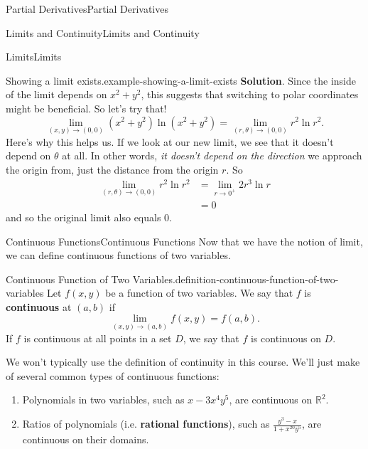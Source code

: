 \documentclass[10pt,]{book}
\newcommand{\terminology}[1]{\textbf{#1}}
\numberwithin{equation}{section}
\newcommand{\RR}{\mathbb{R}}
\begin{document}
\begin{chapterptx}{Partial Derivatives}{}{Partial Derivatives}{}{}
\begin{sectionptx}{Limits and Continuity}{}{Limits and Continuity}{}{}
\begin{subsectionptx}{Limits}{}{Limits}{}{}
\begin{example}{Showing a limit exists.}{example-showing-a-limit-exists}
\noindent\textbf{Solution}.\hypertarget{solution-173}{}\quad%
\hypertarget{p-1130}{}%
Since the inside of the limit depends on \(x^{2}+y^{2}\), this suggests that switching to polar coordinates might be beneficial. So let's try that!%
\begin{equation*}
\lim_{(x,y)\to(0,0)}(x^{2}+y^{2})\ln(x^{2}+y^{2}) = \lim_{(r,\theta)\to(0,0)}r^{2}\ln r^{2}.
\end{equation*}
Here's why this helps us. If we look at our new limit, we see that it doesn't depend on \(\theta\) at all. In other words, \emph{it doesn't depend on the direction} we approach the origin from, just the distance from the origin \(r\). So%
\begin{align*}
\lim_{(r,\theta)\to(0,0)}r^{2}\ln r^{2} & = \lim_{r\to0^{+}} 2r^{3}\ln r \\
& = 0 
\end{align*}
and so the original limit also equals \(0\).%
\end{example}
\end{subsectionptx}
%
%
\typeout{************************************************}
\typeout{************************************************}
%
\begin{subsectionptx}{Continuous Functions}{}{Continuous Functions}{}{}\label{subsection-continuous-functions}
\hypertarget{p-1131}{}%
Now that we have the notion of limit, we can define continuous functions of two variables.%
\begin{definition}{Continuous Function of Two Variables.}{definition-continuous-function-of-two-variables}%
\hypertarget{p-1132}{}%
Let \(f(x,y)\) be a function of two variables. We say that \(f\) is \terminology{continuous} at \((a,b)\) if%
\begin{equation*}
\lim_{(x,y)\to(a,b)}f(x,y) = f(a,b).
\end{equation*}
If \(f\) is continuous at all points in a set \(D\), we say that \(f\) is continuous on \(D\).%
\end{definition}
\hypertarget{p-1133}{}%
We won't typically use the definition of continuity in this course. We'll just make of several common types of continuous functions:%
\leavevmode%
\begin{enumerate}
\item\hypertarget{li-92}{}Polynomials in two variables, such as \(x-3x^{4}y^{5}\), are continuous on \(\RR^{2}\).%
\item\hypertarget{li-93}{}Ratios of polynomials (i.e. \terminology{rational functions}), such as \(\frac{y^{3}-x}{1+x^{20}y^{5}}\), are continuous on their domains.%

\end{enumerate}
\end{subsectionptx}
\end{sectionptx}
\end{chapterptx}
\end{document}
